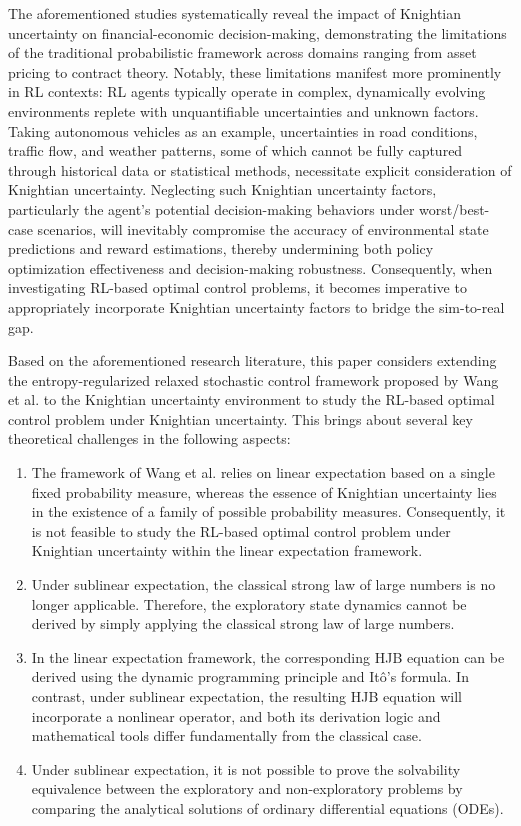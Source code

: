 \documentclass[onecolumn, journal]{IEEEtran} %
\begin{document}
	The aforementioned studies systematically reveal the impact of Knightian uncertainty on financial-economic decision-making, demonstrating the limitations of the traditional probabilistic framework across domains ranging from asset pricing to contract theory. Notably, these limitations manifest more prominently in RL contexts: RL agents typically operate in complex, dynamically evolving environments replete with unquantifiable uncertainties and unknown factors. Taking autonomous vehicles as an example, uncertainties in road conditions, traffic flow, and weather patterns, some of which cannot be fully captured through historical data or statistical methods, necessitate explicit consideration of Knightian uncertainty. Neglecting such Knightian uncertainty factors, particularly the agent's potential decision-making behaviors under worst/best-case scenarios, will inevitably compromise the accuracy of environmental state predictions and reward estimations, thereby undermining both policy optimization effectiveness and decision-making robustness. Consequently, when investigating RL-based optimal control problems, it becomes imperative to appropriately incorporate Knightian uncertainty factors to bridge the sim-to-real gap. 
	
	Based on the aforementioned research literature, this paper considers extending the entropy-regularized relaxed stochastic control framework proposed by Wang et al. \cite{wang2020reinforcement} to the Knightian uncertainty environment to study the RL-based optimal control problem under Knightian uncertainty. This brings about several key theoretical challenges in the following aspects:
	
	\begin{enumerate}
		\item The framework of Wang et al. \cite{wang2020reinforcement} relies on linear expectation based on a single fixed probability measure, whereas the essence of Knightian uncertainty lies in the existence of a family of possible probability measures. Consequently, it is not feasible to study the RL-based optimal control problem under Knightian uncertainty within the linear expectation framework.
		
		\item Under sublinear expectation, the classical strong law of large numbers is no longer applicable. Therefore, the exploratory state dynamics cannot be derived by simply applying the classical strong law of large numbers.
		
		\item In the linear expectation framework, the corresponding HJB equation can be derived using the dynamic programming principle and Itô's formula. In contrast, under sublinear expectation, the resulting HJB equation will incorporate a nonlinear operator, and both its derivation logic and mathematical tools differ fundamentally from the classical case.
		
		\item Under sublinear expectation, it is not possible to prove the solvability equivalence between the exploratory and non-exploratory problems by comparing the analytical solutions of ordinary differential equations (ODEs).
	\end{enumerate}
	
\end{document}
